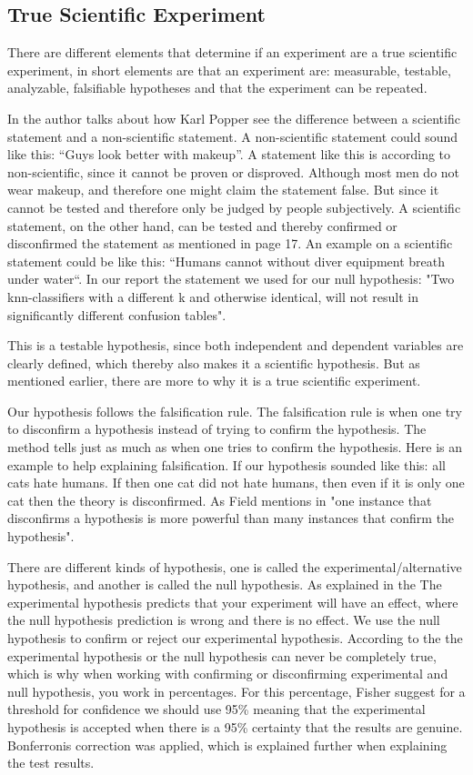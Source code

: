 \subsection{True Scientific Experiment}
There are different elements that determine if an experiment are a true scientific experiment, in short elements are that an experiment are: measurable, testable, analyzable, falsifiable hypotheses and that the experiment can be repeated.

In \citep{Design} the author talks about how Karl Popper see the difference between a scientific statement and a non-scientific statement. A non-scientific statement could sound like this: “Guys look better with makeup”. A statement like this is according to \citep{Design} non-scientific, since it cannot be proven or disproved. Although most men do not wear makeup, and therefore one might claim the statement false. But since it cannot be tested and therefore only be judged by people subjectively. 
A scientific statement, on the other hand, can be tested and thereby confirmed or disconfirmed the statement as mentioned in \citep{Design} page 17. An example on a scientific statement could be like this: “Humans cannot without diver equipment breath under water“.
In our report the statement we used for our null hypothesis: "Two knn-classifiers with a different k and otherwise identical, will not result in significantly different confusion tables". 

This is a testable hypothesis, since both independent and dependent variables are clearly defined, which thereby also makes it a scientific hypothesis. But as mentioned earlier, there are more to why it is a true scientific experiment. 

Our hypothesis follows the falsification rule.
The falsification rule is when one try to disconfirm a hypothesis instead of trying to confirm the hypothesis. The method tells just as much as when one tries to confirm the hypothesis. Here is an example to help explaining  falsification. If our hypothesis sounded like this: all cats hate humans. If then one cat did not hate humans, then even if it is only one cat then the theory is disconfirmed. As Field mentions in \citep[page 17]{Design} "one instance that disconfirms a hypothesis is more powerful than many instances that confirm the hypothesis".

There are different kinds of hypothesis, one is called the experimental/alternative hypothesis, and another is called the null hypothesis. As explained in the \citep[page 141]{Design} The experimental hypothesis predicts that your experiment will have an effect, where the null hypothesis prediction is wrong and there is no effect.
We use the null hypothesis to confirm or reject our experimental hypothesis. According to the \citep{Design} the experimental hypothesis or the null hypothesis can never be completely true, which is why when working with confirming or disconfirming experimental and null hypothesis, you work in percentages. For this percentage, Fisher suggest for a threshold for confidence we should use 95\% meaning that the experimental hypothesis is accepted when there is a 95\% certainty that the results are genuine. Bonferronis correction was applied, which is explained further when explaining the test results. 

